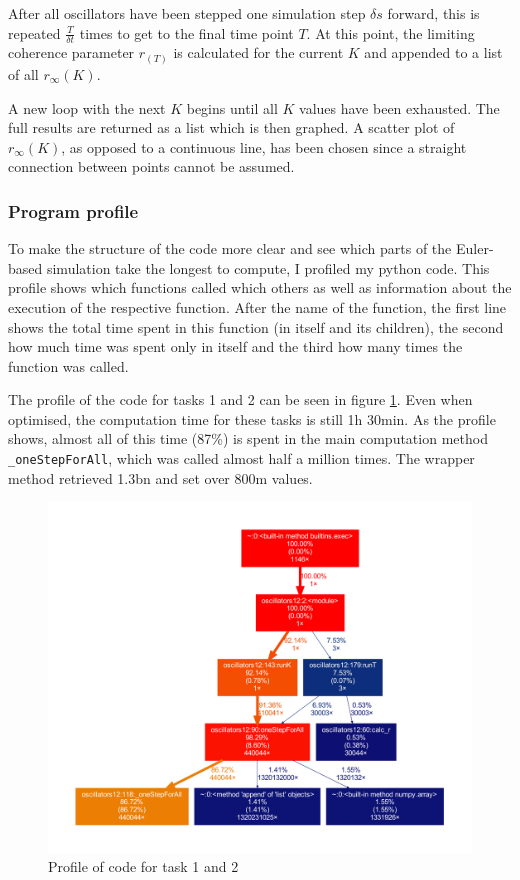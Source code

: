\documentclass[11pt,a4paper]{article}
\newcommand{\graph}{\medskip\noindent}
\newcommand{\code}[1]{\texttt{#1}}
\begin{document}
\graph
After all oscillators have been stepped one simulation step $\delta s$ forward, this is repeated $\frac{T}{\delta t}$ times to get to the final time point $T$.
At this point, the limiting coherence parameter $r_(T)$ is calculated for the current $K$ and appended to a list of all $r_\infty(K)$. 

A new loop with the next $K$ begins until all $K$ values have been exhausted. 
The full results are returned as a list which is then graphed.
A scatter plot of $r_\infty(K)$, as opposed to a continuous line, has been chosen since a straight connection between points cannot be assumed.





\subsubsection{Program profile}
To make the structure of the code more clear and see which parts of the Euler-based simulation take the longest to compute, I profiled my python code. 
This profile shows which functions called which others as well as information about the execution of the respective function. 
After the name of the function, the first line shows the total time spent in this function (in itself and its children), the second how much time was spent only in itself and the third how many times the function was called.

\graph
The profile of the code for tasks 1 and 2 can be seen in figure \ref{profile12}.
Even when optimised, the computation time for these tasks is still 1h 30min. 
As the profile shows, almost all of this time (87\%) is spent in the main computation method \code{\_oneStepForAll}, which was called almost half a million times. 
The wrapper method retrieved 1.3bn and set over 800m values.


\begin{figure}[p]
	\centering
	\includegraphics[width=\textwidth]{graphics/profile12.pdf}
	\caption{Profile of code for task 1 and 2}
	\label{profile12}
\end{figure}
\end{document}
